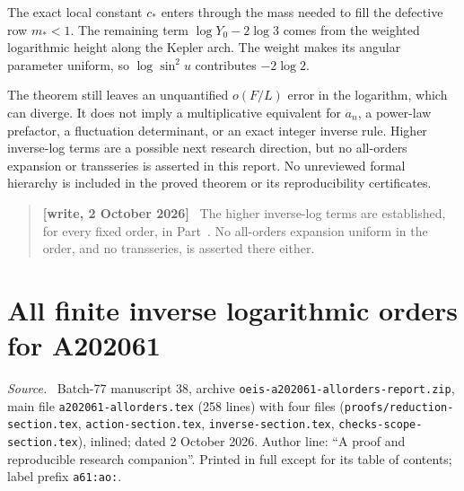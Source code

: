 \documentclass[11pt,letterpaper]{article}
\numberwithin{equation}{section}
\theoremstyle{remark}\newtheorem{remark}[theorem]{Remark}
\newenvironment{writenote}{\par\smallskip\begin{quote}\small\textbf{[write, 2 October 2026]}\ }{\end{quote}\smallskip}
\newenvironment{partsource}{\par\medskip\noindent\begin{minipage}{\linewidth}\small\raggedright\textit{Source.}\ }{\end{minipage}\par\medskip}
\begin{document}
The exact local constant $c_*$ enters through the mass needed to fill
the defective row $m_*<1$. The remaining term
$\log Y_0-2\log3$ comes from the weighted logarithmic height along the
Kepler arch. The weight makes its angular parameter uniform, so
$\log\sin^2u$ contributes $-2\log2$.

The theorem still leaves an unquantified $o(F/L)$ error in the logarithm,
which can diverge. It does not imply a multiplicative equivalent for
$a_n$, a power-law prefactor, a fluctuation determinant, or an exact
integer inverse rule. Higher inverse-log terms are a possible next
research direction, but no all-orders expansion or transseries is
asserted in this report. No unreviewed formal hierarchy is included in
the proved theorem or its reproducibility certificates.
\begin{writenote}
The higher inverse-log terms are established, for every fixed order, in Part~\ref{a61:part:ao}. No all-orders expansion uniform in the order, and no transseries, is asserted there either.
\end{writenote}



\part{All finite inverse logarithmic orders for A202061}\label{a61:part:ao}

\begin{partsource}
Batch-77 manuscript 38, archive \texttt{oeis-a202061-allorders-report.zip}, main file \texttt{a202061-allorders.tex} (258 lines) with four \verb|| files (\texttt{proofs/reduction-section.tex}, \texttt{action-section.tex}, \texttt{inverse-section.tex}, \texttt{checks-scope-section.tex}), inlined; dated 2 October 2026. Author line: ``A proof and reproducible research companion''. Printed in full except for its table of contents; label prefix \texttt{a61:ao:}.
\end{partsource}
\end{document}
